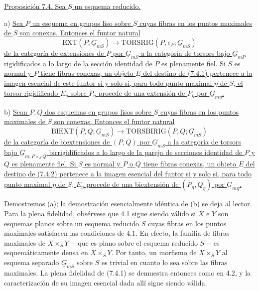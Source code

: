 
\medskip
\noindent\underline{Proposición 7.4. Sea $S$ un esquema reducido.}

\smallskip
\noindent a) \underline{Sea $P$ un esquema en grupos liso sobre $S$
cuyas fibras en los puntos maximales de $S$ son conexas. Entonces el
funtor natural}
\begin{equation}\tag{7.4.1}
 \mathrm{EXT}(P,\underline G_{mS})
 \longrightarrow
 \mathrm{TORSRIG}(P,e_P;\underline G_{mS})
\end{equation}
\underline{de la categoría de extensiones de $P$ por
$\underline G_{mS}$ a la categoría de torsors bajo
$\underline G_{mP}$ rigidificados a lo largo de la sección identidad
de $P$ es plenamente fiel. Si $S$ es normal y $P$ tiene fibras conexas,
un objeto $E$ del destino de (7.4.1) pertenece a la imagen esencial de
este funtor si y solo si, para todo punto maximal $\eta$ de $S$, el
torsor rigidificado $E_\eta$ sobre $P_\eta$ procede de una extensión de
$P_\eta$ por $\underline G_{m\eta}$.}

\smallskip
\noindent b) \underline{Sean $P,Q$ dos esquemas en grupos lisos sobre
$S$ cuyas fibras en los puntos maximales de $S$ son conexas. Entonces
el funtor natural}
\begin{equation}\tag{7.4.2}
 \mathrm{BIEXT}(P,Q;\underline G_{mS})
 \longrightarrow
 \mathrm{TORSBIRIG}(P,Q;\underline G_{mS})
\end{equation}
\underline{de la categoría de biextensiones de $(P,Q)$ por
$\underline G_{mS}$ a la categoría de torsors bajo
$\underline G_{m,P\times_S Q}$ birrigidificados a lo largo de la
pareja de secciones identidad de $P$ y $Q$ es plenamente fiel. Si $S$
es normal y $P$ o $Q$ tiene fibras conexas, un objeto $E$ del destino
de (7.4.2) pertenece a la imagen esencial del funtor si y solo si, para
todo punto maximal $\eta$ de $S$, $E_\eta$ procede de una biextensión de
$(P_\eta,Q_\eta)$ por $\underline G_{m\eta}$.}

Demostremos (a); la demostración esencialmente idéntica de (b) se deja
al lector. Para la plena fidelidad, obsérvese que 4.1 sigue siendo
válido si $X$ e $Y$ son esquemas planos sobre un esquema reducido $S$
cuyas fibras en los puntos maximales satisfacen las condiciones de 4.1.
En efecto, la familia de fibras maximales de $X\times_S Y$ —que es
plano sobre el esquema reducido $S$— es esquemáticamente densa en
$X\times_S Y$. Por tanto, un morfismo de $X\times_S Y$ al esquema
separado $\underline G_{mS}$ sobre $S$ es trivial en cuanto lo sea
sobre las fibras maximales. La plena fidelidad de (7.4.1) se demuestra
entonces como en 4.2, y la caracterización de su imagen esencial dada
allí sigue siendo válida.

